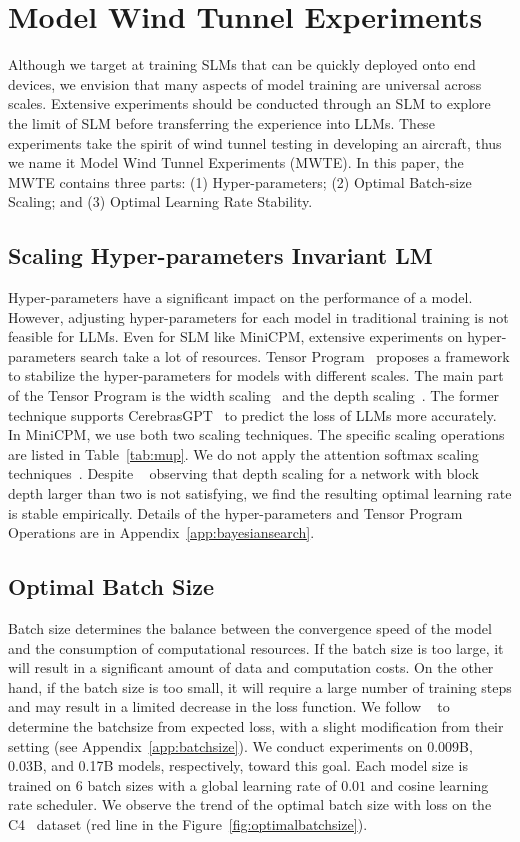 \documentclass[dvipsnames]{article}
\begin{document}
\section{Model Wind Tunnel Experiments}
\label{MWTE}
Although we target at training SLMs that can be quickly deployed onto end devices, we envision that many aspects of model training are universal across scales. Extensive experiments should be conducted through an SLM to explore the limit of SLM before transferring the experience into LLMs. These experiments take the spirit of wind tunnel testing in developing an aircraft, thus we name it Model Wind Tunnel Experiments (MWTE). In this paper, the MWTE contains three parts: (1) Hyper-parameters; (2) Optimal Batch-size Scaling; and (3) Optimal Learning Rate Stability.

\subsection{Scaling Hyper-parameters Invariant LM}
Hyper-parameters have a significant impact on the performance of a model. However, adjusting hyper-parameters for each model in traditional training is not feasible for LLMs. Even for SLM like MiniCPM, extensive experiments on hyper-parameters search take a lot of resources. Tensor Program~\citep{yang2022tensor, yang2023tensor} proposes a framework to stabilize the hyper-parameters for models with different scales. The main part of the Tensor Program is the width scaling~\citep{yang2022tensor} and the depth scaling~\citep{yang2023tensor}. The former technique supports CerebrasGPT~\citep{dey2023cerebras} to predict the loss of LLMs more accurately. In MiniCPM, we use both two scaling techniques. The specific scaling operations are listed in Table~\ref{tab:mup}. We do not apply the attention softmax scaling techniques~\citep{yang2022tensor}. Despite ~\cite{yang2023tensor} observing that depth scaling for a network with block depth larger than two is not satisfying, we find the resulting optimal learning rate is stable empirically. Details of the hyper-parameters and Tensor Program Operations are in Appendix~\ref{app:bayesiansearch}.

\subsection{Optimal Batch Size}
Batch size determines the balance between the convergence speed of the model and the consumption of computational resources. If the batch size is too large, it will result in a significant amount of data and computation costs. On the other hand, if the batch size is too small, it will require a large number of training steps and may result in a limited decrease in the loss function. We follow ~\cite{kaplan2020scaling} to determine the batchsize from expected loss, with a slight modification from their setting (see Appendix~\ref{app:batchsize}). We conduct experiments on 0.009B, 0.03B, and 0.17B models, respectively, toward this goal. Each model size is trained on 6 batch sizes with a global learning rate of $0.01$ and cosine learning rate scheduler. We observe the trend of the optimal batch size with loss on the C4~\citep{2019t5} dataset (red line in the Figure~\ref{fig:optimalbatchsize}).
\end{document}
